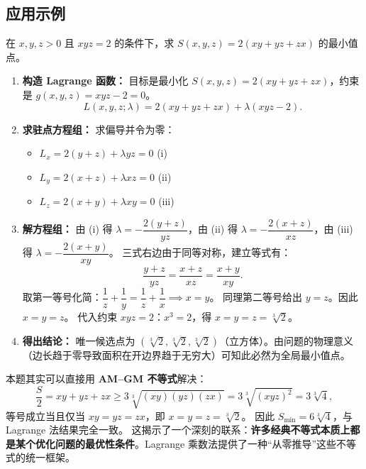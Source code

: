 \documentclass[lang=cn,11pt]{elegantbook}
\begin{document}
\subsection{应用示例}

\begin{example} \label{ex:box-lagrangian}
在 $x,y,z>0$ 且 $xyz=2$ 的条件下，求 $S(x,y,z)=2(xy+yz+zx)$ 的最小值点。
\end{example}

\begin{solution}
\begin{enumerate}
  \item \textbf{构造 Lagrange 函数：} 目标是最小化 $S(x,y,z)=2(xy+yz+zx)$，约束是 $g(x,y,z)=xyz-2=0$。
  \[
  L(x,y,z;\lambda) = 2(xy+yz+zx)+\lambda(xyz-2).
  \]
  \item \textbf{求驻点方程组：} 求偏导并令为零：
  \begin{itemize}
    \item $L_x=2(y+z)+\lambda yz=0$ \quad (i)
    \item $L_y=2(x+z)+\lambda xz=0$ \quad (ii)
    \item $L_z=2(x+y)+\lambda xy=0$ \quad (iii)
  \end{itemize}
  \item \textbf{解方程组：} 
  由 (i) 得 $\lambda=-\dfrac{2(y+z)}{yz}$，由 (ii) 得 $\lambda=-\dfrac{2(x+z)}{xz}$，由 (iii) 得 $\lambda=-\dfrac{2(x+y)}{xy}$。
  三式右边由于同等对称，建立等式有：
  \[ \frac{y+z}{yz}=\frac{x+z}{xz}=\frac{x+y}{xy}. \]
  取第一等号化简：$\dfrac{1}{z}+\dfrac{1}{y}=\dfrac{1}{z}+\dfrac{1}{x} \implies x=y$。
  同理第二等号给出 $y=z$。因此 $x=y=z$。
  代入约束 $xyz=2$：$x^3=2$，得 $x=y=z=\sqrt[3]{2}$。
  \item \textbf{得出结论：} 唯一候选点为 $(\sqrt[3]{2},\sqrt[3]{2},\sqrt[3]{2})$（立方体）。由问题的物理意义（边长趋于零导致面积在开边界趋于无穷大）可知此必然为全局最小值点。
\end{enumerate}
\end{solution}

\begin{remark}
本题其实可以直接用 \textbf{AM--GM 不等式}解决：
\[
\frac{S}{2}=xy+yz+zx\geq 3\sqrt[3]{(xy)(yz)(zx)} =3\sqrt[3]{(xyz)^2}=3\sqrt[3]{4},
\]
等号成立当且仅当 $xy=yz=zx$，即 $x=y=z=\sqrt[3]{2}$。
因此 $S_{\min}=6\sqrt[3]{4}$，与 Lagrange 法结果完全一致。
这揭示了一个深刻的联系：\textbf{许多经典不等式本质上都是某个优化问题的最优性条件}。Lagrange 乘数法提供了一种“从零推导”这些不等式的统一框架。
\end{remark}
\end{document}
